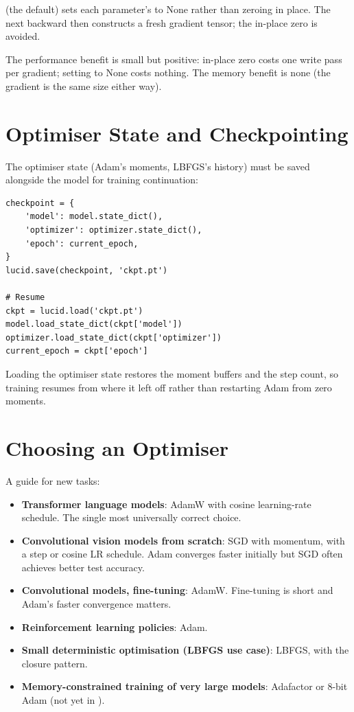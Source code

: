  (the default)
sets each parameter's  to None rather than zeroing
in place. The next backward then constructs a fresh gradient
tensor; the in-place zero is avoided.

The performance benefit is small but positive: in-place zero
costs one write pass per gradient; setting to None costs nothing.
The memory benefit is none (the gradient is the same size
either way).

\section{Optimiser State and Checkpointing}
\label{sec:optimizers:checkpointing}

The optimiser state (Adam's moments, LBFGS's history) must be
saved alongside the model for training continuation:

\begin{lstlisting}[style=lucid,language=LucidPython]
checkpoint = {
    'model': model.state_dict(),
    'optimizer': optimizer.state_dict(),
    'epoch': current_epoch,
}
lucid.save(checkpoint, 'ckpt.pt')

# Resume
ckpt = lucid.load('ckpt.pt')
model.load_state_dict(ckpt['model'])
optimizer.load_state_dict(ckpt['optimizer'])
current_epoch = ckpt['epoch']
\end{lstlisting}

Loading the optimiser state restores the moment buffers and the
step count, so training resumes from where it left off rather
than restarting Adam from zero moments.

\section{Choosing an Optimiser}
\label{sec:optimizers:choosing}

A guide for new tasks:

\begin{itemize}
  \item \textbf{Transformer language models}: AdamW with
    cosine learning-rate schedule. The single most universally
    correct choice.
  \item \textbf{Convolutional vision models from scratch}:
    SGD with momentum, with a step or cosine LR schedule. Adam
    converges faster initially but SGD often achieves better
    test accuracy.
  \item \textbf{Convolutional models, fine-tuning}: AdamW.
    Fine-tuning is short and Adam's faster convergence matters.
  \item \textbf{Reinforcement learning policies}: Adam.
  \item \textbf{Small deterministic optimisation (LBFGS use
    case)}: LBFGS, with the closure pattern.
  \item \textbf{Memory-constrained training of very large models}:
    Adafactor or 8-bit Adam (not yet in \Lucid).
\end{itemize}

